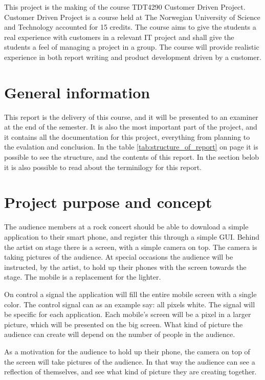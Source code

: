 This project is the making of the course TDT4290 Customer Driven Project. 
Customer Driven Project is a course held at The Norwegian University of Science and Technology accounted for 15 credits. The course aims to give the students a real experience with customers in a relevant IT project and shall give the students a feel of managing a project in a group. The course will provide realistic experience in both report writing and product development driven by a customer. 
\section{General information}
This report is the delivery of this course, and it will be presented to an examiner at the end of the semester. It is also the most important part of the project, and it contains all the documentation for this project, everything from planning to the evalation and conclusion. In the table \ref{tab:structure_of_report} on page \pageref{tab:structure_of_report} it is possible to see the structure, and the contents of this report. In the section belob it is also possible to read about the terminilogy for this report.

\section{Project purpose and concept}
The audience members at a rock concert should be able to download a simple application to their smart phone, and register this through a simple GUI.
Behind the artist on stage there is a screen, with a simple camera on top. 
The camera is taking pictures of the audience. 
At special occasions the audience will be instructed, by the artist, to hold up their phones with the screen towards the stage. 
The mobile is a replacement for the lighter.  

On control a signal the application will fill the entire mobile screen with a single color.
The control signal can as an example say: all pixels white.
The signal will be specific for each application.
Each mobile's screen will be a pixel in a larger picture, which will be presented on the big screen. 
What kind of picture the audience can create will depend on the number of people in the audience. 

As a motivation for the audience to hold up their phone, the camera on top of the screen will take pictures of the audience.
In that way the audience can see a reflection of themselves, and see what kind of picture they are creating together.

